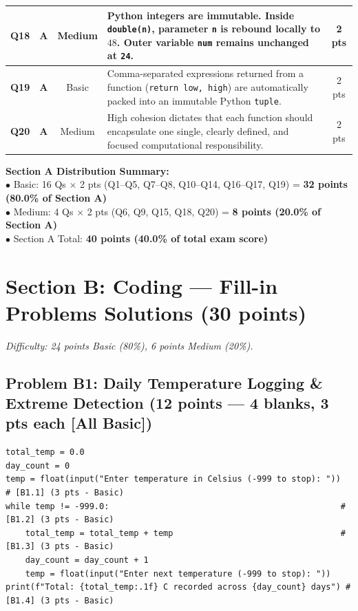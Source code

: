 \documentclass[11pt,a4paper]{article}
\begin{document}
\begin{center}
\begin{tabularx}{\textwidth}{|c|c|c|X|c|}
\hline
\textbf{Q18} & \textbf{A} & Medium & Python integers are immutable. Inside \texttt{double(n)}, parameter \texttt{n} is rebound locally to $48$. Outer variable \texttt{num} remains unchanged at \texttt{24}. & 2 pts \\
\hline
\textbf{Q19} & \textbf{A} & Basic & Comma-separated expressions returned from a function (\texttt{return low, high}) are automatically packed into an immutable Python \texttt{tuple}. & 2 pts \\
\hline
\textbf{Q20} & \textbf{A} & Medium & High cohesion dictates that each function should encapsulate one single, clearly defined, and focused computational responsibility. & 2 pts \\
\hline
\end{tabularx}
\end{center}

\vspace{0.6mm}
\begin{tcolorbox}[colback=boxbg, colframe=primaryblue!45, arc=1.2mm, left=2.0mm, right=2.0mm, top=0.8mm, bottom=0.8mm]
\small
\textbf{Section A Distribution Summary:}\\
$\bullet$ Basic: 16 Qs $\times$ 2 pts (Q1--Q5, Q7--Q8, Q10--Q14, Q16--Q17, Q19) = \textbf{32 points (80.0\% of Section A)}\\
$\bullet$ Medium: 4 Qs $\times$ 2 pts (Q6, Q9, Q15, Q18, Q20) = \textbf{8 points (20.0\% of Section A)}\\
$\bullet$ Section A Total: \textbf{40 points (40.0\% of total exam score)}
\end{tcolorbox}

\vspace{-1.0mm}
\section*{Section B: Coding --- Fill-in Problems Solutions (30 points)}
\textit{Difficulty: 24 points Basic (80\%), 6 points Medium (20\%).}

\subsection*{Problem B1: Daily Temperature Logging \& Extreme Detection (12 points --- 4 blanks, 3 pts each [All Basic])}

\begin{lstlisting}
total_temp = 0.0
day_count = 0
temp = float(input("Enter temperature in Celsius (-999 to stop): "))  # [B1.1] (3 pts - Basic)
while temp != -999.0:                                               # [B1.2] (3 pts - Basic)
    total_temp = total_temp + temp                                  # [B1.3] (3 pts - Basic)
    day_count = day_count + 1
    temp = float(input("Enter next temperature (-999 to stop): "))
print(f"Total: {total_temp:.1f} C recorded across {day_count} days") # [B1.4] (3 pts - Basic)
\end{lstlisting}
\end{document}
